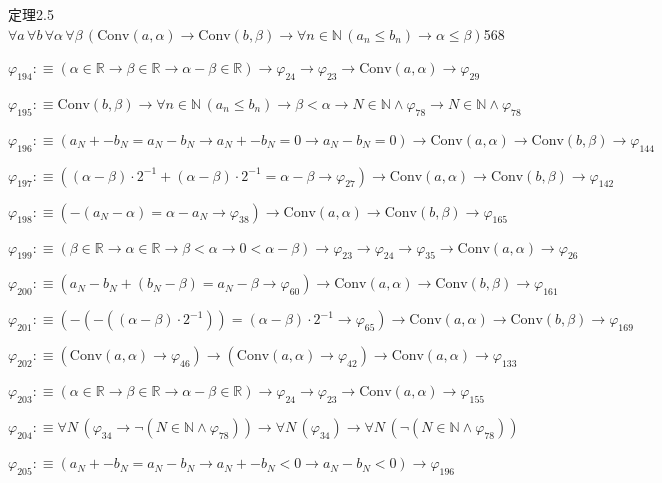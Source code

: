 \begin{fullproof}{定理2.5}{$\forall a\,\forall b\,\forall \alpha\,\forall \beta\,(\mathrm{Conv}(a,\alpha) \to \mathrm{Conv}(b,\beta) \to \forall n \in \mathbb{N}\,(a_{n} \leq b_{n}) \to \alpha \leq \beta)$}{568}
\begin{abbrevlist}
\item $\varphi_{194} :\equiv (\alpha \in \mathbb{R} \to \beta \in \mathbb{R} \to \alpha - \beta \in \mathbb{R}) \to \varphi_{24} \to \varphi_{23} \to \mathrm{Conv}(a,\alpha) \to \varphi_{29}$
\item $\varphi_{195} :\equiv \mathrm{Conv}(b,\beta) \to \forall n \in \mathbb{N}\,(a_{n} \leq b_{n}) \to \beta < \alpha \to N \in \mathbb{N} \land \varphi_{78} \to N \in \mathbb{N} \land \varphi_{78}$
\item $\varphi_{196} :\equiv (a_{N} + -b_{N} = a_{N} - b_{N} \to a_{N} + -b_{N} = 0 \to a_{N} - b_{N} = 0) \to \mathrm{Conv}(a,\alpha) \to \mathrm{Conv}(b,\beta) \to \varphi_{144}$
\item $\varphi_{197} :\equiv ((\alpha - \beta) \cdot 2^{-1} + (\alpha - \beta) \cdot 2^{-1} = \alpha - \beta \to \varphi_{27}) \to \mathrm{Conv}(a,\alpha) \to \mathrm{Conv}(b,\beta) \to \varphi_{142}$
\item $\varphi_{198} :\equiv (-(a_{N} - \alpha) = \alpha - a_{N} \to \varphi_{38}) \to \mathrm{Conv}(a,\alpha) \to \mathrm{Conv}(b,\beta) \to \varphi_{165}$
\item $\varphi_{199} :\equiv (\beta \in \mathbb{R} \to \alpha \in \mathbb{R} \to \beta < \alpha \to 0 < \alpha - \beta) \to \varphi_{23} \to \varphi_{24} \to \varphi_{35} \to \mathrm{Conv}(a,\alpha) \to \varphi_{26}$
\item $\varphi_{200} :\equiv (a_{N} - b_{N} + (b_{N} - \beta) = a_{N} - \beta \to \varphi_{60}) \to \mathrm{Conv}(a,\alpha) \to \mathrm{Conv}(b,\beta) \to \varphi_{161}$
\item $\varphi_{201} :\equiv (-(-((\alpha - \beta) \cdot 2^{-1})) = (\alpha - \beta) \cdot 2^{-1} \to \varphi_{65}) \to \mathrm{Conv}(a,\alpha) \to \mathrm{Conv}(b,\beta) \to \varphi_{169}$
\item $\varphi_{202} :\equiv (\mathrm{Conv}(a,\alpha) \to \varphi_{46}) \to (\mathrm{Conv}(a,\alpha) \to \varphi_{42}) \to \mathrm{Conv}(a,\alpha) \to \varphi_{133}$
\item $\varphi_{203} :\equiv (\alpha \in \mathbb{R} \to \beta \in \mathbb{R} \to \alpha - \beta \in \mathbb{R}) \to \varphi_{24} \to \varphi_{23} \to \mathrm{Conv}(a,\alpha) \to \varphi_{155}$
\item $\varphi_{204} :\equiv \forall N\,(\varphi_{34} \to \neg (N \in \mathbb{N} \land \varphi_{78})) \to \forall N\,(\varphi_{34}) \to \forall N\,(\neg (N \in \mathbb{N} \land \varphi_{78}))$
\item $\varphi_{205} :\equiv (a_{N} + -b_{N} = a_{N} - b_{N} \to a_{N} + -b_{N} < 0 \to a_{N} - b_{N} < 0) \to \varphi_{196}$

\end{abbrevlist}
\end{fullproof}
